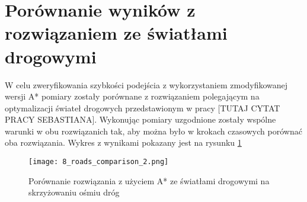 \section{Porównanie wyników z rozwiązaniem ze światłami drogowymi}

W celu zweryfikowania szybkości podejścia z wykorzystaniem zmodyfikowanej wersji A* pomiary zostały porównane z rozwiązaniem polegającym na optymalizacji świateł drogowych przedstawionym w pracy [TUTAJ CYTAT PRACY SEBASTIANA].
\newline
\newline
Wykonując pomiary uzgodnione zostały wspólne warunki w obu rozwiązanich tak, aby można było w krokach czasowych porównać oba rozwiązania.
\newline
\newline
Wykres z wynikami pokazany jest na rysunku \ref{comparison}
\begin{figure}[ht]
  \texttt{[image: 8\_roads\_comparison\_2.png]}
  \caption{Porównanie rozwiązania z użyciem A* ze światłami drogowymi na skrzyżowaniu ośmiu dróg}
  \label{comparison}
\end{figure}
